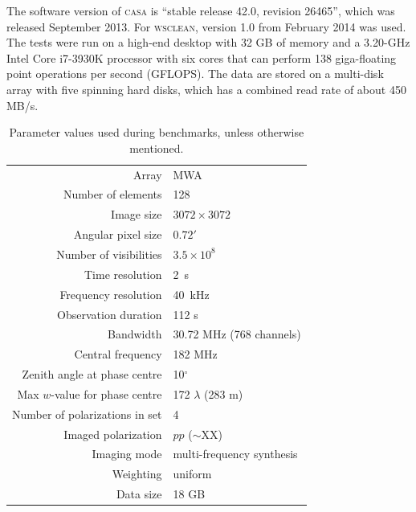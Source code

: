\documentclass[useAMS,usenatbib]{mn2e}
\newcommand{\degree}{\ensuremath{^{\circ}}\xspace}
\begin{document}
The software version of \textsc{casa} is ``stable release 42.0, revision 26465'', which was released September 2013. For \textsc{wsclean}, version 1.0 from February 2014 was used. The tests were run on a high-end desktop with 32 GB of memory and a 3.20-GHz Intel Core i7-3930K processor with six cores that can perform 138 giga-floating point operations per second (GFLOPS). The data are stored on a multi-disk array with five spinning hard disks, which has a combined read rate of about 450 MB/s.
\begin{table}%
\caption{Parameter values used during benchmarks, unless otherwise mentioned.} \label{tbl:default-parameters}%
\begin{center}\begin{tabular}{rl}%
\hline
Array & MWA \\
Number of elements & 128 \\
Image size & $3072 \times 3072$ \\
Angular pixel size & $0.72'$ \\
Number of visibilities & $3.5 \times 10^8$ \\
Time resolution & 2~s \\
Frequency resolution & 40~kHz \\
Observation duration & 112 s\\
Bandwidth & 30.72 MHz (768 channels)\\
Central frequency & 182 MHz \\
Zenith angle at phase centre & 10\degree \\
Max $w$-value for phase centre & 172 $\lambda$ (283 m) \\
Number of polarizations in set & 4 \\
Imaged polarization & $pp$ ($\sim$XX) \\
Imaging mode & multi-frequency synthesis \\
Weighting & uniform \\
Data size & 18 GB \\
\hline
\end{tabular}\end{center}\end{table}
\end{document}
